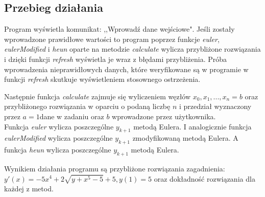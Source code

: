 \documentclass[12pt]{article}
\begin{document}
\subsection{Przebieg działania}
Program wyświetla komunikat: ,,Wprowadź dane wejściowe". Jeśli zostały wprowadzone prawidłowe wartości to program poprzez funkcje \emph{euler}, \emph{eulerModified} i \emph{heun} oparte na metodzie \emph{calculate} wylicza przybliżone rozwiązania i dzięki funkcji \emph{refresh} wyświetla je wraz z błędami przybliżenia.
Próba wprowadzenia nieprawidłowych danych, które weryfikowane są w programie w funkcji \emph{refresh} skutkuje wyświetleniem stosownego ostrzeżenia.
\par Następnie funkcja \emph{calculate}  zajmuje się wyliczeniem węzłów $x_0, x_1, ... ,x_n=b$ oraz przybliżonego rozwiązania w oparciu o podaną liczbę $n$ i przedział wyznaczony przez $a=1$dane w zadaniu oraz $b$ wprowadzone przez użytkownika. 
\\
Funkcja \emph{euler} wylicza poszczególne $y_{k+1}$ metodą Eulera.
I analogicznie funkcja \emph{eulerModified} wylicza poszczególne $y_{k+1}$ zmodyfikowaną metodą Eulera. A funkcja \emph{heun} wylicza poszczególne $y_{k+1}$ metodą Eulera.



Wynikiem działania programu są przybliżone rozwiązania zagadnienia: $y'(x)= -5x^4+2 \sqrt{y+x^5-5}+5, y(1)=5$  oraz dokładność rozwiązania dla każdej z metod.
\newpage
\end{document}
